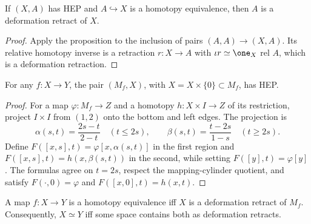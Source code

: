 \begin{corollary}
\label{cor:hep-inclusion-homotopy-equiv-deformation-retract}





If $(X,A)$ has HEP and $A\hookrightarrow X$ is a homotopy equivalence, then $A$ is
a deformation retract of $X$.
\end{corollary}

\begin{proof}

\sketch Apply the proposition to the inclusion of pairs $(A,A)\to(X,A)$. Its
relative homotopy inverse is a retraction $r:X\to A$ with $\iota r\simeq\one_X$
rel $A$, which is a deformation retraction.
\end{proof}

\begin{lemma}
\label{lem:mapping-cylinder-pair-hep}





For any $f:X\to Y$, the pair $(M_f,X)$, with $X=X\times\{0\}\subset M_f$, has HEP.
\end{lemma}

\begin{proof}

\sketch For a map $\varphi:M_f\to Z$ and a homotopy $h:X\times I\to Z$ of its
restriction, project $I\times I$ from $(1,2)$ onto the bottom and left edges. The
projection is
\[
\alpha(s,t)=\frac{2s-t}{2-t}\quad(t\le2s),\qquad
\beta(s,t)=\frac{t-2s}{1-s}\quad(t\ge2s).
\]
Define $F([x,s],t)=\varphi[x,\alpha(s,t)]$ in the first region and
$F([x,s],t)=h(x,\beta(s,t))$ in the second, while setting $F([y],t)=\varphi[y]$.
The formulas agree on $t=2s$, respect the mapping-cylinder quotient, and satisfy
$F(\cdot,0)=\varphi$ and $F([x,0],t)=h(x,t)$.
\end{proof}

\begin{corollary}
\label{cor:homotopy-equivalence-iff-deformation-retract-mapping-cylinder}





A map $f:X\to Y$ is a homotopy equivalence iff $X$ is a deformation retract of
$M_f$. Consequently, $X\simeq Y$ iff some space contains both as deformation retracts.
\end{corollary}

